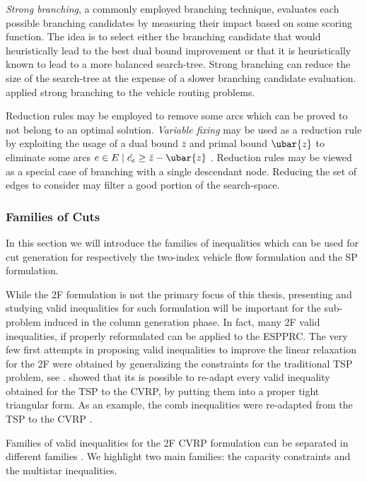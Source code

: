 \textit{Strong branching}, a commonly employed branching technique,
evaluates each possible branching candidates
by measuring their impact based on some scoring function.
The idea is to select either the branching candidate that
would heuristically lead to the best dual bound improvement
or that it is heuristically known to lead to a more balanced search-tree.
Strong branching can reduce the size of the search-tree
at the expense of a slower branching candidate evaluation.
\textcite{fukasawa2006, pecin2017limited, pecin2017new} applied strong branching
to the vehicle routing problems.

\medskip

Reduction rules may be employed to remove some arcs
which can be proved to not belong to an optimal solution.
\textit{Variable fixing} may be used as a reduction rule by exploiting
the usage of a dual bound $\bar{z}$ and primal bound $\ubar{z}$ to eliminate some
arcs $e \in E \mid \hat{c_e} \ge \bar{z} - \ubar{z}$ \parencite{hadjar2006, irnich2010}.
Reduction rules may be viewed as a special case of branching
with a single descendant node.
Reducing the set of edges to consider may filter a good portion of the search-space.

\subsubsection{Families of Cuts}
\label{sec:families-of-cuts}

In this section we will introduce the families of inequalities
which can be used for cut generation for respectively
the two-index vehicle flow formulation
and the SP formulation.

While the 2F formulation is not the primary focus of this thesis,
presenting and studying valid inequalities for such formulation
will be important for the sub-problem induced in the column generation phase.
In fact, many 2F valid inequalities, if properly reformulated
can be applied to the ESPPRC.
The very few first attempts in proposing valid inequalities
to improve the linear relaxation for the 2F were obtained by
generalizing the constraints for the traditional TSP problem, see \textcite{naddef1993}.
\citeauthor{naddef1993} showed that its is possible to re-adapt
every valid inequality obtained for the TSP to the CVRP,
by putting them into a proper tight triangular form.
As an example,
the comb inequalities were re-adapted from the TSP to the CVRP \parencite{chvatal1973,grotschel1979,augerat1995approche}.

Families of valid inequalities for the 2F CVRP formulation
can be separated in different families \parencite{toth2014}.
We highlight two main families: the capacity constraints and the multistar inequalities.

